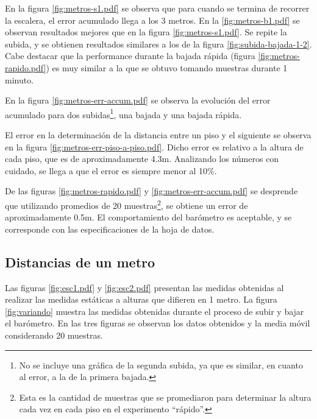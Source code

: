 \documentclass[main]{subfiles}
\begin{document}
En la figura \ref{fig:metros-s1.pdf} se observa que para cuando se termina de recorrer la escalera, el error acumulado llega a los 3 metros. En la \ref{fig:metros-b1.pdf} se observan resultados mejores que en la figura \ref{fig:metros-s1.pdf}. Se repite la subida, y se obtienen resultados similares a los de la figura \ref{fig:subida-bajada-1-2}. Cabe destacar que la performance durante la bajada r\'apida (figura \ref{fig:metros-rapido.pdf}) es muy similar a la que se obtuvo tomando muestras durante 1 minuto.

En la figura \ref{fig:metros-err-accum.pdf} se observa la evoluci\'on del error acumulado para dos subidas\footnote{No se incluye una gr\'afica de la segunda subida, ya que es similar, en cuanto al error, a la de la primera bajada.}, una bajada y una bajada r\'apida.

El error en la determinaci\'on de la distancia entre un piso y el siguiente se observa en la figura \ref{fig:metros-err-piso-a-piso.pdf}. Dicho error es relativo a la altura de cada piso, que es de aproximadamente 4.3m. Analizando los n\'umeros con cuidado, se llega a que el error es siempre menor al 10\%.

De las figuras \ref{fig:metros-rapido.pdf} y \ref{fig:metros-err-accum.pdf} se desprende que utilizando promedios de 20 muestras\footnote{Esta es la cantidad de muestras que se promediaron para determinar la altura cada vez en cada piso en el experimento ``r\'apido''.}, se obtiene un error de aproximadamente 0.5m. El comportamiento del bar\'ometro es aceptable, y se corresponde con las especificaciones de la hoja de datos.

\subsection{Distancias de un metro}

Las figuras \ref{fig:esc1.pdf} y \ref{fig:esc2.pdf} presentan las medidas obtenidas al realizar las medidas est\'aticas a alturas que difieren en 1 metro. La figura \ref{fig:variando} muestra las medidas obtenidas durante el proceso de subir y bajar el bar\'ometro. En las tres figuras se observan los datos obtenidos y la media m\'ovil considerando 20 muestras.
\end{document}
